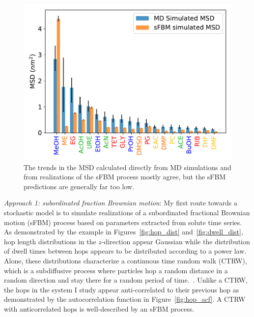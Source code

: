 \documentclass{article}
\begin{document}
  \begin{figure}
  \centering
  \vspace{-0.6cm}
  \includegraphics[width=\linewidth]{all_tamsds.pdf}
  \caption{The trends in the MSD calculated directly from MD simulations and from
  realizations of the sFBM process mostly agree, but the sFBM predictions are generally
  far too low.}\label{fig:sFBM_MSDs}
  \vspace{-0.5cm}
  \end{figure}

  \textit{Approach 1: subordinated fraction Brownian motion}: My first route 
  towards a stochastic model is to simulate realizations of a subordinated 
  fractional Brownian motion (sFBM) process based on parameters extracted 
  from solute time series. As demonstrated by the example in 
  Figures~\ref{fig:hop_dist} and~\ref{fig:dwell_dist}, hop length 
  distributions in the $z$-direction appear Gaussian while the distribution
  of dwell times between hops appears to be distributed according to a power
  law. Alone, these distributions characterize a continuous time random walk
  (CTRW), which is a subdiffusive process where particles hop a random distance
  in a random direction and stay there for a random period of time.~\cite{meroz_toolbox_2015}.
  Unlike a CTRW, the hops in the system I study appear anti-correlated to 
  their previous hop as demonstrated by the autocorrelation function in 
  Figure~\ref{fig:hop_acf}. A CTRW with anticorrelated hops is well-described
  by an sFBM process.~\cite{meroz_subdiffusion_2010}
\end{document}
